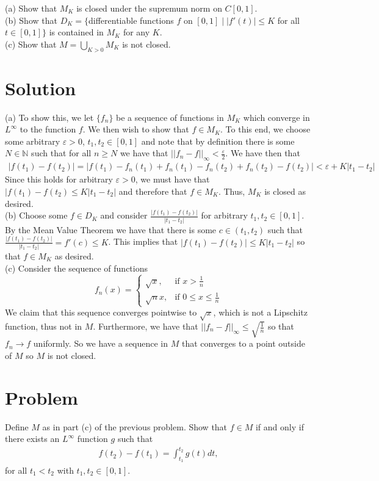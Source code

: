 \documentclass{article}
\begin{document}
\noindent (a) Show that $M_K$ is closed under the supremum norm on $C[0,1]$.\\

\noindent (b) Show that $D_K=\{$differentiable functions $f$ on $[0,1]\mid|f'(t)|\leq K$ for all $t\in[0,1]\}$ is contained in $M_K$ for any $K$.\\

\noindent (c) Show that $M=\bigcup_{K>0}M_K$ is not closed.

\section*{Solution}
(a) To show this, we let $\{f_n\}$ be a sequence of functions in $M_K$ which converge in $L^\infty$ to the function $f$.  We then wish to show that $f\in M_K$.  To this end, we choose some arbitrary $\varepsilon>0$, $t_1,t_2\in[0,1]$ and note that by definition there is some $N\in\mathbb{N}$ such that for all $n\geq N$ we have that $||f_n-f||_\infty<\frac{\varepsilon}{2}$.  We have then that
\begin{align*}
|f(t_1)-f(t_2)|=|f(t_1)-f_n(t_1)+f_n(t_1)-f_n(t_2)+f_n(t_2)-f(t_2)|<\varepsilon+K|t_1-t_2|
\end{align*}
Since this holds for arbitrary $\varepsilon>0$, we must have that $|f(t_1)-f(t_2)\leq K|t_1-t_2|$ and therefore that $f\in M_K$.  Thus, $M_K$ is closed as desired.\\

\noindent (b) Choose some $f\in D_K$ and consider $\frac{|f(t_1)-f(t_2)|}{|t_1-t_2|}$ for arbitrary $t_1,t_2\in [0,1]$.  By the Mean Value Theorem we have that there is some $c\in (t_1,t_2)$ such that $\frac{|f(t_1)-f(t_2)|}{|t_1-t_2|}=f'(c)\leq K$.  This implies that $|f(t_1)-f(t_2)|\leq K|t_1-t_2|$ so that $f\in M_K$ as desired.\\

\noindent (c) Consider the sequence of functions $$
f_n(x) =
\begin{cases}
\sqrt{x}, & \text{if }x>\frac{1}{n} \\
\sqrt{n}x, & \text{if }0\leq x\leq\frac{1}{n}
\end{cases}
$$
We claim that this sequence converges pointwise to $\sqrt{x}$, which is not a Lipschitz function, thus not in $M$.  Furthermore, we have that $||f_n-f||_\infty\leq\sqrt{\frac{1}{n}}$ so that $f_n\rightarrow f$ uniformly.  So we have a sequence in $M$ that converges to a point outside of $M$ so $M$ is not closed.


\section*{Problem}
Define $M$ as in part (c) of the previous problem.  Show that $f\in M$ if and only if there exists an $L^\infty$ function $g$ such that 
\begin{align*}
f(t_2)-f(t_1)=\int_{t_1}^{t_2}g(t)dt,
\end{align*}
for all $t_1<t_2$ with $t_1, t_2\in[0,1]$.
\end{document}
